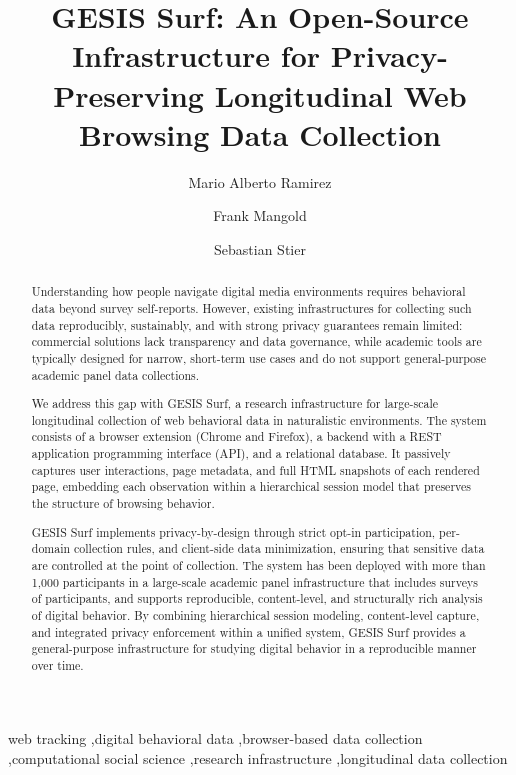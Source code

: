 \documentclass[preprint,12pt,a4paper]{elsarticle}
\begin{document}
  \renewcommand{\labelenumii}{\arabic{enumi}.\arabic{enumii}}

  \begin{frontmatter}

    \title{GESIS Surf: An Open-Source %
    Infrastructure for Privacy-Preserving Longitudinal Web Browsing Data Collection}

    \author[label1]{Mario Alberto Ramirez}
    \author[label1]{Frank Mangold}
    \author[label1,label2]{Sebastian Stier}
    \address[label1]{Department Computational Social Science,
    GESIS~-- Leibniz Institute for the Social Sciences,
    Unter Sachsenhausen 6--8, 50667 Cologne, Germany}
    \address[label2]{School of Social Sciences, University of Mannheim,
    A5, 6, 68159 Mannheim, Germany}

\begin{abstract}
Understanding how people navigate digital media environments requires behavioral data beyond survey self-reports. However, existing infrastructures for collecting such data reproducibly, sustainably, and with strong privacy guarantees remain limited: commercial solutions lack transparency and data governance, while academic tools are typically designed for narrow, short-term use cases and do not support general-purpose academic panel data collections.

We address this gap with GESIS Surf, a research infrastructure for large-scale longitudinal collection of web behavioral data in naturalistic environments. The system consists of a browser extension (Chrome and Firefox), a backend with a REST application programming interface (API), and a relational database. It passively captures user interactions, page metadata, and full HTML snapshots of each rendered page, embedding each observation within a hierarchical session model that preserves the structure of browsing behavior.

GESIS Surf implements privacy-by-design through strict opt-in participation, per-domain collection rules, and client-side data minimization, ensuring that sensitive data are controlled at the point of collection. The system has been deployed with more than 1,000 participants in a large-scale academic panel infrastructure that includes surveys of participants, and supports reproducible, content-level, and structurally rich analysis of digital behavior. By combining hierarchical session modeling, content-level capture, and integrated privacy enforcement within a unified system, GESIS Surf provides a general-purpose infrastructure for studying digital behavior in a reproducible manner over time.

    \end{abstract}

    \begin{keyword}
      web tracking \sep digital behavioral data \sep browser-based data collection \sep computational social science \sep research infrastructure \sep longitudinal data collection

    \end{keyword}
  \end{frontmatter}
\end{document}
